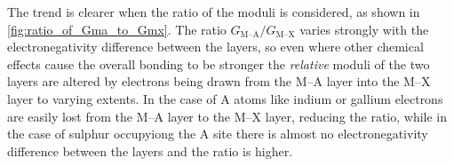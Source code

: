 The trend is clearer when the ratio of the moduli is considered, as shown in \autoref{fig:ratio_of_Gma_to_Gmx}. The ratio $G_{\text{M--A}}/G_{\text{M--X}}$ varies strongly with the electronegativity difference between the layers, so even where other chemical effects cause the overall bonding to be stronger the \emph{relative} moduli of the two layers are altered by electrons being drawn from the M--A layer into the M--X layer to varying extents. In the case of A atoms like indium or gallium electrons are easily lost from the M--A layer to the M--X layer, reducing the ratio, while in the case of sulphur occupyiong the A site there is almost no electronegativity difference between the layers and the ratio is higher.


\begin{figure}
\centering


\end{figure}
